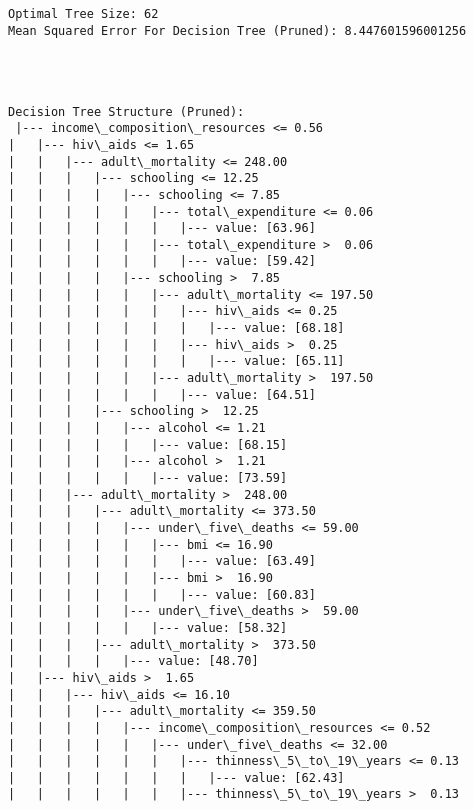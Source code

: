 \documentclass[11pt]{article}
\begin{document}
    \begin{Verbatim}[commandchars=\\\{\}]
Optimal Tree Size: 62
Mean Squared Error For Decision Tree (Pruned): 8.447601596001256
    \end{Verbatim}

    \begin{center}
    \end{center}
    { \hspace*{\fill} \\}
    
    \begin{Verbatim}[commandchars=\\\{\}]

Decision Tree Structure (Pruned):
 |--- income\_composition\_resources <= 0.56
|   |--- hiv\_aids <= 1.65
|   |   |--- adult\_mortality <= 248.00
|   |   |   |--- schooling <= 12.25
|   |   |   |   |--- schooling <= 7.85
|   |   |   |   |   |--- total\_expenditure <= 0.06
|   |   |   |   |   |   |--- value: [63.96]
|   |   |   |   |   |--- total\_expenditure >  0.06
|   |   |   |   |   |   |--- value: [59.42]
|   |   |   |   |--- schooling >  7.85
|   |   |   |   |   |--- adult\_mortality <= 197.50
|   |   |   |   |   |   |--- hiv\_aids <= 0.25
|   |   |   |   |   |   |   |--- value: [68.18]
|   |   |   |   |   |   |--- hiv\_aids >  0.25
|   |   |   |   |   |   |   |--- value: [65.11]
|   |   |   |   |   |--- adult\_mortality >  197.50
|   |   |   |   |   |   |--- value: [64.51]
|   |   |   |--- schooling >  12.25
|   |   |   |   |--- alcohol <= 1.21
|   |   |   |   |   |--- value: [68.15]
|   |   |   |   |--- alcohol >  1.21
|   |   |   |   |   |--- value: [73.59]
|   |   |--- adult\_mortality >  248.00
|   |   |   |--- adult\_mortality <= 373.50
|   |   |   |   |--- under\_five\_deaths <= 59.00
|   |   |   |   |   |--- bmi <= 16.90
|   |   |   |   |   |   |--- value: [63.49]
|   |   |   |   |   |--- bmi >  16.90
|   |   |   |   |   |   |--- value: [60.83]
|   |   |   |   |--- under\_five\_deaths >  59.00
|   |   |   |   |   |--- value: [58.32]
|   |   |   |--- adult\_mortality >  373.50
|   |   |   |   |--- value: [48.70]
|   |--- hiv\_aids >  1.65
|   |   |--- hiv\_aids <= 16.10
|   |   |   |--- adult\_mortality <= 359.50
|   |   |   |   |--- income\_composition\_resources <= 0.52
|   |   |   |   |   |--- under\_five\_deaths <= 32.00
|   |   |   |   |   |   |--- thinness\_5\_to\_19\_years <= 0.13
|   |   |   |   |   |   |   |--- value: [62.43]
|   |   |   |   |   |   |--- thinness\_5\_to\_19\_years >  0.13

\end{Verbatim}
\end{document}
